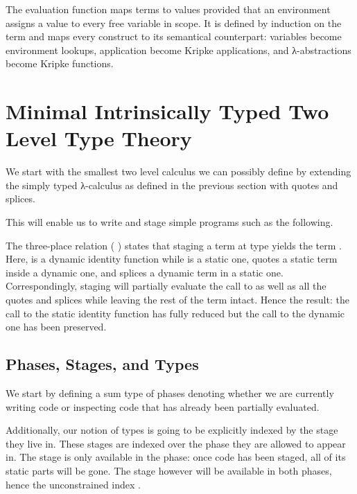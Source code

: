 \documentclass{article}
\begin{document}

The evaluation function maps terms to values provided that
an environment assigns a value to every free variable in scope.
It is defined by induction on the term and maps every construct
to its semantical counterpart: variables become environment lookups,
application become Kripke applications, and λ-abstractions become
Kripke functions.

\begin{AgdaSuppressSpace}
\end{AgdaSuppressSpace}

\section{Minimal Intrinsically Typed Two Level Type Theory}

We start with the smallest two level calculus we can possibly define
by extending the simply typed λ-calculus as defined in the previous
section with quotes and splices.

This will enable us to write and stage simple programs such as the following.


The three-place relation (    ) states
that staging a term  at type  yields the term .
%
Here,  is a dynamic identity function
while  is a static one,
 quotes a static term inside a dynamic one,
and  splices a dynamic term in a static one.
%
Correspondingly, staging will partially evaluate the call to
 as well as all the quotes and splices while leaving
the rest of the term intact.
%
Hence the result: the call to the static identity function has
fully reduced but the call to the dynamic one has been preserved.


\subsection{Phases, Stages, and Types}

We start by defining a sum type of phases denoting whether
we are currently writing  code or inspecting
 code that has already been partially evaluated.


Additionally, our notion of types is going to be explicitly
indexed by the stage they live in. These stages are indexed
over the phase they are allowed to appear in.
%
The  stage is only available in the 
phase: once code has been staged, all of its static parts will
be gone.
%
The  stage however will be available in both
phases, hence the unconstrained index .
\end{document}
